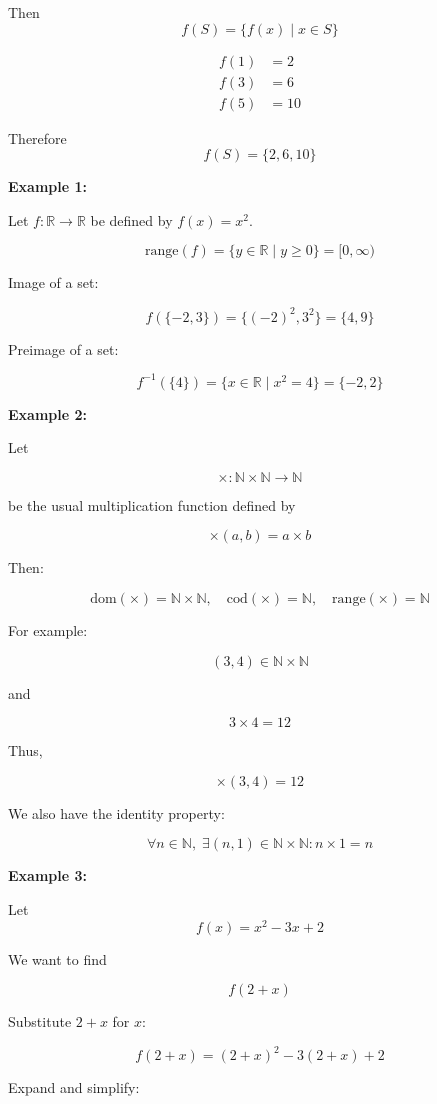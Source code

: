 \documentclass[12pt,a4paper,openany]{article}
\begin{document}
Then \[f(S) = \{f(x) \mid x \in S\}\]

\[\begin{aligned}
f(1) &= 2\\
f(3) &= 6\\
f(5) &= 10
\end{aligned}\]

Therefore 
\[
\boxed{f(S) = \{2, 6, 10\}}
\]

\textbf{Example 1:}

Let $f : \mathbb{R} \to \mathbb{R}$ be defined by $f(x) = x^2$.

\[
\text{range}(f) = \{y \in \mathbb{R} \mid y \geq 0\} = [0, \infty)
\]

Image of a set:

\[
f(\{-2, 3\}) = \{(-2)^2, 3^2\} = \{4, 9\}
\]

Preimage of a set:

\[
f^{-1}(\{4\}) = \{x \in \mathbb{R} \mid x^2 = 4\} = \{-2, 2\}
\]

\textbf{Example 2:}

Let

\[
\times : \mathbb{N} \times \mathbb{N} \to \mathbb{N}
\]

be the usual multiplication function defined by

\[
\times(a, b) = a \times b
\]

Then:

\[
\text{dom}(\times) = \mathbb{N} \times \mathbb{N}, \quad
\text{cod}(\times) = \mathbb{N}, \quad
\text{range}(\times) = \mathbb{N}
\]

For example:

\[
(3, 4) \in \mathbb{N} \times \mathbb{N}
\]

and

\[
3 \times 4 = 12
\]

Thus,

\[
\times(3, 4) = 12
\]

We also have the identity property:

\[
\forall n \in \mathbb{N}, \; \exists (n, 1) \in \mathbb{N} \times \mathbb{N} : n \times 1 = n
\]

\textbf{Example 3:}

Let
\[
f(x) = x^2 - 3x + 2
\]

We want to find

\[
f(2 + x)
\]

Substitute $2 + x$ for $x$:

\[
f(2 + x) = (2 + x)^2 - 3(2 + x) + 2
\]

Expand and simplify:
\end{document}
